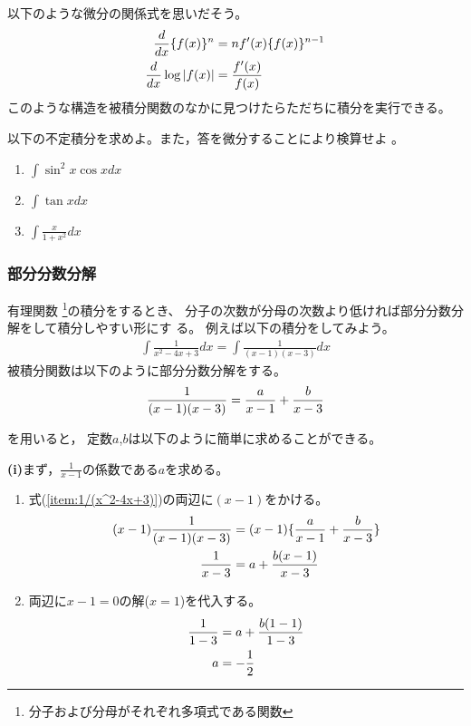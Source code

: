 \documentclass[twocolumn,11pt]{jarticle}
\begin{document}
以下のような微分の関係式を思いだそう。
\begin{align}
  \frac{d}{dx}\{f(x)\}^n&=nf'(x)\{f(x)\}^{n-1}\notag\\
  \frac{d}{dx}\log |f(x)|&=\frac{f'(x)}{f(x)}\notag
\end{align}
このような構造を被積分関数のなかに見つけたらただちに積分を実行できる。

\exercise
以下の不定積分を求めよ。また，答を微分することにより検算せよ
。
\begin{enumerate}
\item \label{item:sin2xcosx}$\displaystyle\int\sin^2x\cos xdx$
\item \label{item:tanx}$\displaystyle\int \tan x dx$
\item \label{item:x/(1+x2)}$\displaystyle\int \frac{x}{1+x^2}dx$
\end{enumerate}

\subsubsection{部分分数分解}

有理関数
\footnote{分子および分母がそれぞれ多項式である関数}の積分をするとき、
分子の次数が分母の次数より低ければ部分分数分解をして積分しやすい形にす
る。
例えば以下の積分をしてみよう。
\begin{align}
  \label{item:1/(x^2-4x+3)}
  \int \frac{1}{x^2-4x+3}dx=\int \frac{1}{(x-1)(x-3)}dx
\end{align}
被積分関数は以下のように部分分数分解をする。
\begin{align}
  \frac{1}{(x-1)(x-3)}=\frac{a}{x-1}+\frac{b}{x-3}\notag
\end{align}

を用いると，
定数$a$,$b$は以下のように簡単に求めることができる。

\noindent
\textbf{(i)}まず，$\frac{1}{x-1}$の係数である$a$を求める。
\begin{enumerate}
\item 式(\ref{item:1/(x^2-4x+3)})の両辺に$(x-1)$をかける。
\begin{align}
  (x-1)\frac{1}{(x-1)(x-3)}&=(x-1)\{\frac{a}{x-1}+\frac{b}{x-3}\}\notag\\
  \frac{1}{x-3}&=a+\frac{b(x-1)}{x-3}\notag
\end{align}
\item 両辺に$x-1=0$の解($x=1$)を代入する。
\begin{align}
  \frac{1}{1-3}&=a+\frac{b(1-1)}{1-3}\notag\\
  a&=-\frac{1}{2}\notag
\end{align}
\end{enumerate}
\end{document}
